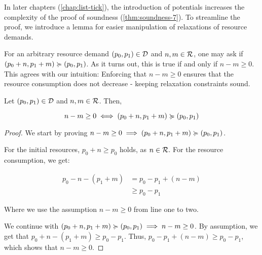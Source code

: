 In later chapters (\cref{chap:list-tick}), the introduction of potentials increases the complexity of the proof of soundness (\cref{thm:soundness-7}). To streamline the proof, we introduce a lemma for easier manipulation of relaxations of resource demands.

For an arbitrary resource demand \((p_0, p_1) \in \mathcal{D}\) and \(n, m \in \mathcal{R}\), one may ask if \((p_0 + n, p_1 + m) \succcurlyeq (p_0, p_1)\). As it turns out, this is true if and only if \(n - m \geq 0\). This agrees with our intuition: Enforcing that \(n - m \geq 0\) ensures that the resource consumption does not decrease - keeping relaxation constraints sound.

\begin{lemma}\label{lemma:pos-relaxation}
   Let \((p_0, p_1) \in \mathcal{D}\) and \(n, m \in \mathcal{R}\). Then,

   \[
      n - m \geq 0 \iff (p_0 + n, p_1 + m) \succcurlyeq (p_0, p_1)
   \]
\end{lemma}

\begin{proof}
   We start by proving \(n - m \geq 0 \implies (p_0 + n, p_1 + m) \succcurlyeq (p_0, p_1)\).

   For the initial resources, \(p_0 + n \geq p_0\) holds, as \(n \in \mathcal{R}\). For the resource consumption, we get:

   \begin{align*}
      p_0 - n - (p_1 + m)  & = p_0 - p_1 + (n - m) \\
                           & \geq p_0 - p_1
   \end{align*}

   Where we use the assumption \(n - m \geq 0\) from line one to two. 


   We continue with \((p_0 + n, p_1 + m) \succcurlyeq (p_0, p_1) \implies n - m \geq 0\). By assumption, we get that \(p_0 + n - (p_1 + m) \geq p_0 - p_1\). Thus, \(p_0 - p_1 + (n - m) \geq p_0 - p_1\), which shows that \(n - m \geq 0\). 
\end{proof}

